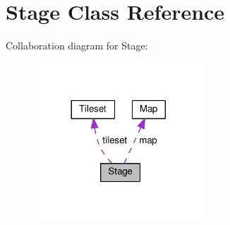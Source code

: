 \hypertarget{classStage}{}\section{Stage Class Reference}
\label{classStage}


Collaboration diagram for Stage\+:\nopagebreak
\begin{figure}[H]
\begin{center}
\leavevmode
\includegraphics[width=180pt]{classStage__coll__graph}
\end{center}
\end{figure}
